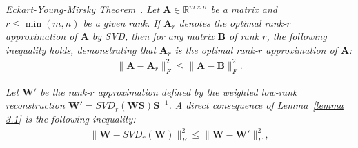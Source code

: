 \begin{lemma} \label{lemma 3.1}
    \textit{Eckart-Young-Mirsky Theorem}\textnormal{~\cite{horn2012matrix}}. \textit{Let $\boldsymbol{A}\in\mathbb{R}^{m\times n}$ be a matrix and $r\le\min(m,n)$ be a given rank. If $\boldsymbol{A}_r$ denotes the optimal rank-$r$ approximation of $\boldsymbol{A}$ by SVD, then for any matrix $\boldsymbol{B}$ of rank $r$, the following inequality holds, demonstrating that $\boldsymbol{A}_r$ is the optimal rank-$r$ approximation of $\boldsymbol{A}$:}
\begin{align}
    \big\|\boldsymbol{A}-\boldsymbol{A}_r\big\|_F^2 \le \big\|\boldsymbol{A}-\boldsymbol{B}\big\|_F^2.
\end{align}
\end{lemma}

\begin{lemma} \label{lemma 3.2}
    \textit{Let $\boldsymbol{W}'$ be the rank-$r$ approximation defined by the weighted low-rank reconstruction $\boldsymbol{W}' = SVD_r(\boldsymbol{WS})\boldsymbol{S}^{-1}$. A direct consequence of Lemma~\ref{lemma 3.1} is the following inequality:}
\begin{align}
   \big\|\boldsymbol{W}-SVD_r(\boldsymbol{W})\big\|_F^2 \le \big\|\boldsymbol{W}-\boldsymbol{W}'\big\|_F^2,
\end{align}
\end{lemma}

